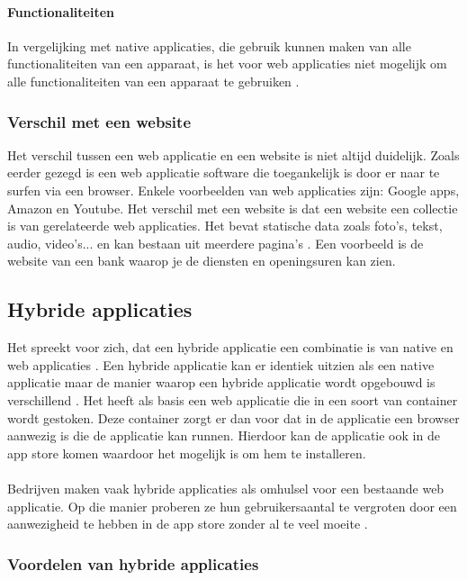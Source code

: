 \paragraph{Functionaliteiten}
In vergelijking met native applicaties, die gebruik kunnen maken van alle functionaliteiten van een 
apparaat, is het voor web applicaties niet mogelijk om alle functionaliteiten van een apparaat te gebruiken 
\autocite{Laarhoven2021}.

\subsubsection{Verschil met een website}
Het verschil tussen een web applicatie en een website is niet altijd duidelijk. Zoals eerder gezegd 
is een web applicatie software die toegankelijk is door er naar te surfen via een browser. 
Enkele voorbeelden van web applicaties zijn: Google apps, Amazon en Youtube. Het verschil met 
een website is dat een website een collectie is van gerelateerde web applicaties. Het bevat statische 
data zoals foto's, tekst, audio, video's... en kan bestaan uit meerdere pagina's 
\autocite{sugandha2022}. Een voorbeeld is de website van een bank waarop je de diensten en 
openingsuren kan zien.

\subsection{Hybride applicaties}
Het spreekt voor zich, dat een hybride applicatie een combinatie is van native en web 
applicaties \autocite{Denko2021}. Een hybride applicatie kan er identiek uitzien als een 
native applicatie maar de manier waarop een hybride applicatie wordt opgebouwd is 
verschillend \autocite{Beeproger2023}. Het heeft als basis een web applicatie die in 
een soort van container wordt gestoken. Deze container zorgt er dan voor dat in de 
applicatie een browser aanwezig is die de applicatie kan runnen. Hierdoor kan de applicatie 
ook in de app store komen waardoor het mogelijk is om hem te installeren. 
\\\\
Bedrijven maken vaak hybride applicaties als omhulsel voor een bestaande web applicatie. 
Op die manier proberen ze hun gebruikersaantal te vergroten door een aanwezigheid te hebben 
in de app store zonder al te veel moeite \autocite{Budiu2016}. 

\subsubsection{Voordelen van hybride applicaties}

